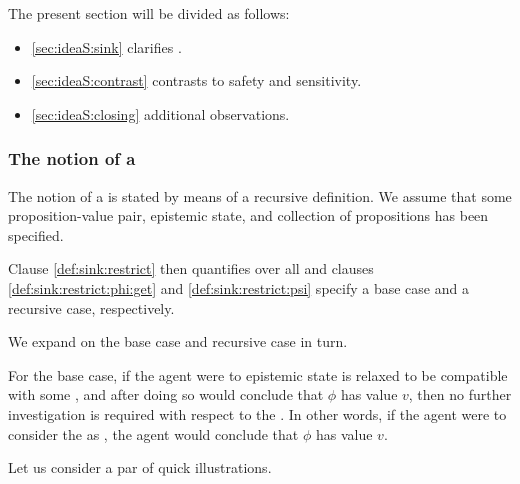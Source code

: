 \begin{note}
  The present section will be divided as follows:
  \begin{itemize}
  \item \autoref{sec:ideaS:sink} clarifies \sink{}.
  \item \autoref{sec:ideaS:contrast} contrasts to safety and sensitivity.
  \item \autoref{sec:ideaS:closing} additional observations.
  \end{itemize}
\end{note}



\subsubsection{The notion of a }
\label{sec:ideaS:sink}

\begin{note}
  The notion of a \sink{} is stated by means of a recursive definition.
  We assume that some proposition-value pair, epistemic state, and collection of propositions has been specified.

  Clause \ref{def:sink:restrict} then quantifies over all  and clauses \ref{def:sink:restrict:phi:get} and \ref{def:sink:restrict:psi} specify a base case and a recursive case, respectively.

  We expand on the base case and recursive case in turn.
\end{note}

\begin{note}
  For the base case, if the agent were to epistemic state is relaxed to be compatible with some \epPW{}, and after doing so would conclude that \(\phi\) has value \(v\), then no further investigation is required with respect to the \epPW{}.
  In other words, if the agent were to consider the \epPW{} as \viableAd{}, the agent would conclude that \(\phi\) has value \(v\).

  Let us consider a par of quick illustrations.
\end{note}

